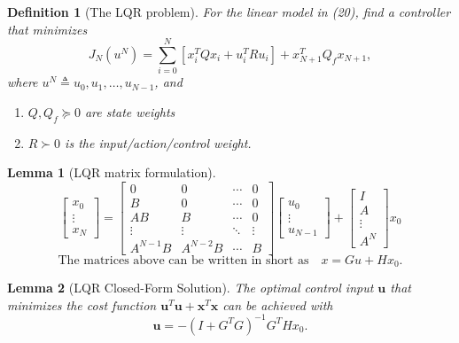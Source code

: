 \documentclass[a4 paper]{article}
\numberwithin{equation}{section}
\theoremstyle{boldStyle}
\theoremstyle{boldBlueStyle}
\newtheorem{lemma}{Lemma}[section]
\theoremstyle{boldPurpleStyle}
\theoremstyle{boldRedStyle}
\newtheorem{definition}{Definition}[section]
\begin{document}
\begin{definition}[The LQR problem]
  For the linear model in (20), find a controller that minimizes
  \[
  J_N(u^N) = \sum_{i=0}^{N} [x_i^T Q x_i + u_i^T R u_i] + x_{N+1}^T Q_f x_{N+1},
  \]
  where \( u^N \triangleq u_0, u_1, \ldots, u_{N-1} \), and
  \begin{enumerate}
      \item \( Q, Q_f \succeq 0 \) are state weights
      \item \( R \succ 0 \) is the input/action/control weight. 
  \end{enumerate}
\end{definition}


\begin{lemma}[LQR matrix formulation]
  \[
\begin{bmatrix}
x_0 \\
\vdots \\
x_N
\end{bmatrix}
=
\begin{bmatrix}
0 & 0 & \cdots & 0 \\
B & 0 & \cdots & 0 \\
AB & B & \cdots & 0 \\
\vdots & \vdots & \ddots & \vdots \\
A^{N-1}B & A^{N-2}B & \cdots & B
\end{bmatrix}
\begin{bmatrix}
u_0 \\
\vdots \\
u_{N-1}
\end{bmatrix}
+
\begin{bmatrix}
I \\
A \\
\vdots \\
A^N
\end{bmatrix}
x_0
\]
\[
\text{The matrices above can be written in short as} \quad x = Gu + Hx_0.
\]
\end{lemma}

\begin{lemma}[LQR Closed-Form Solution]
  The optimal control input \( \mathbf{u} \) that minimizes the cost function \( \mathbf{u}^T \mathbf{u} + \mathbf{x}^T \mathbf{x} \) can be achieved with
  \[
  \mathbf{u} = -(I + G^T G)^{-1} G^T H x_0.
  \]
\end{lemma}
\end{document}
